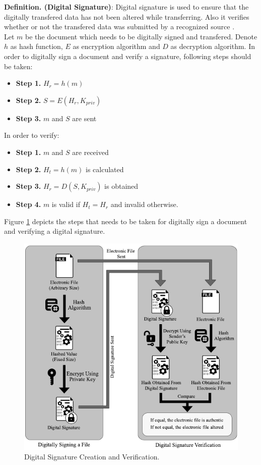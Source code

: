 \textbf{Definition. (Digital Signature)}: Digital signature is used to ensure that the digitally transfered data has not been altered while transferring. Also it verifies whether or not the transfered data was submitted by a recognized source \cite{katz2010digital}.\\
Let $m$ be the document which needs to be digitally signed and transfered. Denote $h$ as hash function, $E$ as encryption algorithm and $D$ as decryption algorithm. In order to digitally sign a document and verify a signature, following steps should be taken:
\begin{itemize}
	\item \textbf{Step 1.} $H_r = h(m)$
	\item \textbf{Step 2.} $S = E(H_r,K_{priv})$
	\item \textbf{Step 3.} $m$ and $S$ are sent
\end{itemize}
In order to verify:
\begin{itemize}
	\item \textbf{Step 1.} $m$ and $S$ are received
	\item \textbf{Step 2.} $H_t = h(m)$ is calculated
	\item \textbf{Step 3.} $H_r = D(S,K_{priv})$ is obtained
	\item \textbf{Step 4.} $m$ is valid if $H_t = H_r$ and invalid otherwise.
\end{itemize}
Figure \ref{fig:DigitalSignature} depicts the steps that needs to be taken for digitally sign a document and verifying a digital signature.\\
\begin{figure}
	\label{fig:DigitalSignature}
	\centering
	\includegraphics[width=\textwidth]{figs/digital_signature.pdf}
	\caption{Digital Signature Creation and Verification.}
\end{figure}
